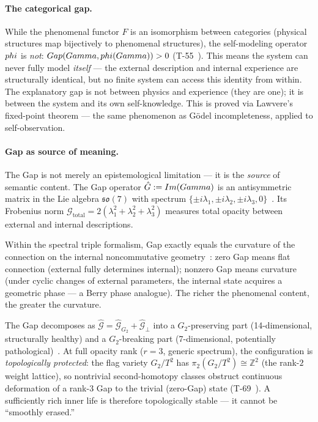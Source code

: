 \paragraph{The categorical gap.}
While the phenomenal functor $F$ is an isomorphism between categories (physical structures
map bijectively to phenomenal structures), the self-modeling operator $phi$ is \emph{not}:
$Gap(Gamma, phi(Gamma)) > 0$ (T-55~). This means the system can never
fully model \emph{itself} --- the external description and internal experience are
structurally identical, but no finite system can access this identity from within.
The explanatory gap is not between physics and experience (they are one); it is between
the system and its own self-knowledge. This is proved via Lawvere's fixed-point
theorem --- the same phenomenon as G\"{o}del incompleteness, applied to self-observation.

\paragraph{Gap as source of meaning.}
The Gap is not merely an epistemological limitation --- it is the \emph{source} of
semantic content. The Gap operator $\hat{G} := Im(Gamma)$ is an
antisymmetric matrix in the Lie algebra $\mathfrak{so}(7)$ with spectrum
$\{\pm i\lambda_1, \pm i\lambda_2, \pm i\lambda_3, 0\}$~. Its Frobenius
norm $\mathcal{G}_{\mathrm{total}} = 2(\lambda_1^2 + \lambda_2^2 + \lambda_3^2)$
measures total opacity between external and internal descriptions.

Within the spectral triple formalism, Gap exactly equals the curvature of the connection
on the internal noncommutative geometry~: zero Gap means flat connection
(external fully determines internal); nonzero Gap means curvature (under cyclic changes
of external parameters, the internal state acquires a geometric phase --- a Berry phase
analogue). The richer the phenomenal content, the greater the curvature.

The Gap decomposes as $\hat{\mathcal{G}} = \hat{\mathcal{G}}_{G_2} +
\hat{\mathcal{G}}_\perp$ into a $G_2$-preserving part (14-dimensional, structurally
healthy) and a $G_2$-breaking part (7-dimensional, potentially pathological)~.
At full opacity rank ($r = 3$, generic spectrum), the configuration is
\emph{topologically protected}: the flag variety $G_2/T^2$ has
$\pi_2(G_2/T^2) \cong \mathbb{Z}^2$ (the rank-$2$ weight lattice), so nontrivial
second-homotopy classes obstruct continuous deformation of a rank-$3$ Gap to the
trivial (zero-Gap) state (T-69~). A sufficiently rich inner life is therefore
topologically stable --- it cannot be ``smoothly erased.''

